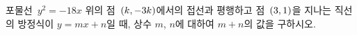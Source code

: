 포물선~$y^2=-18x$ 위의 점~$(k{,}\mkern3mu\mathopen{}-3k)$에서의 접선과 평행하고 점~$(3{,}\mkern3mu\mathopen{}1)$을 지나는 직선의 방정식이 $y=mx+n$일 때, 상수 $m$, $n$에 대하여 $m+n$의 값을 구하시오. 
